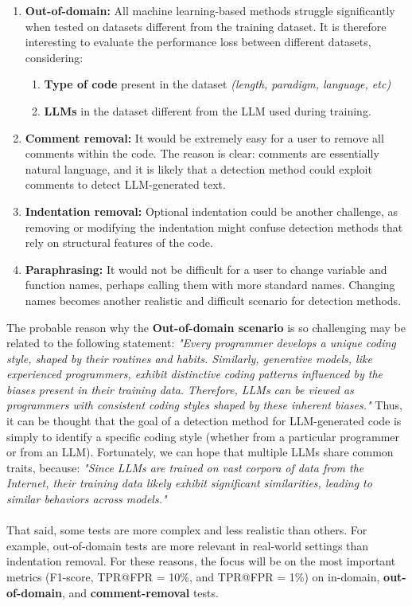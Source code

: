 \begin{enumerate}
\item \textbf{Out-of-domain:} All machine learning-based methods struggle significantly 
when tested on datasets different from the training dataset. It is therefore 
interesting to evaluate the performance loss between different datasets, considering:
    \begin{enumerate}
    \item \textbf{Type of code} present in the dataset \textit{(length, paradigm, language, etc)}
    \item \textbf{LLMs} in the dataset different from the LLM used during training.
    \end{enumerate}
\item \textbf{Comment removal:} It would be extremely easy for a user to remove all 
comments within the code. The reason is clear: comments are essentially 
natural language, and it is likely that a detection method could exploit 
comments to detect LLM-generated text.

\item \textbf{Indentation removal:} Optional indentation could be another challenge, 
as removing or modifying the indentation might confuse detection methods 
that rely on structural features of the code.

\item \textbf{Paraphrasing:} It would not be difficult for a user to change variable and 
function names, perhaps calling them with more standard names. 
Changing names becomes another realistic and difficult scenario for detection methods.
\end{enumerate}

The probable reason why the \textbf{Out-of-domain scenario} is so challenging 
may be related to the following statement:
\textit{"Every programmer develops a unique coding style, shaped by their 
routines and habits. Similarly, generative models, like experienced 
programmers, exhibit distinctive coding patterns influenced by the 
biases present in their training data. Therefore, LLMs can be viewed 
as programmers with consistent coding styles shaped by these inherent biases."}
\cite{ye2023uncovering}
Thus, it can be thought that the goal of a detection method for 
LLM-generated code is simply to identify a specific coding style 
(whether from a particular programmer or from an LLM). Fortunately, 
we can hope that multiple LLMs share common traits, because:
\textit{"Since LLMs are trained on vast corpora of data from the Internet, 
their training data likely exhibit significant similarities, leading 
to similar behaviors across models."}\cite{guo2024biscope}
\\\\
That said, some tests are more complex and less realistic 
than others. For example, out-of-domain tests are more relevant 
in real-world settings than indentation removal. For these reasons, 
the focus will be on the most important metrics 
(F1-score, TPR@FPR = 10\%, and TPR@FPR = 1\%) 
on in-domain, \textbf{out-of-domain}, and \textbf{comment-removal} tests.

